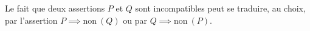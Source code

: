 Le fait que deux assertions $P$ et $Q$ sont incompatibles peut se traduire, au choix, par l'assertion $P \implies \text{non}\ (Q)$ ou par $Q \implies \text{non}\  (P)$.

\begin{reponses}
\end{reponses}

